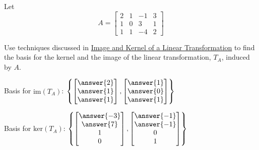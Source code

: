 \documentclass{ximera}
\begin{document}
\begin{exercise}
Let $$A=\begin{bmatrix}2 & 1 & -1 & 3\\1 & 0 & 3 & 1\\1 & 1 & -4 & 2\end{bmatrix}$$
 
Use techniques discussed in \href{https://ximera.osu.edu/linearalgebrav3/LinearAlgebraInteractiveIntro/LTR-0050/main}{Image and Kernel of a Linear Transformation} to find the basis for the kernel and the image of the linear transformation, $T_A$, induced by $A$.
 
Basis for $\mbox{im}(T_A)$: $\left\{\begin{bmatrix}\answer{2}\\\answer{1}\\\answer{1}\end{bmatrix}, \begin{bmatrix}\answer{1}\\\answer{0}\\\answer{1}\end{bmatrix}\right\}$
 
Basis for $\mbox{ker}(T_A)$: $\left\{\begin{bmatrix}\answer{-3}\\\answer{7}\\1\\0\end{bmatrix}, \begin{bmatrix}\answer{-1}\\\answer{-1}\\0\\1\end{bmatrix}\right\}$
 
 \end{exercise}
\end{document}
